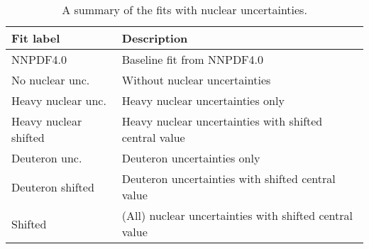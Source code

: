 \begin{table}[h]
  \centering
  \scriptsize
  \renewcommand{\arraystretch}{1.13}
  \begin{tabularx}{0.8\textwidth}{lX}
    \toprule
    {\bf Fit label }     & { \bf Description }\\
    \midrule
    NNPDF4.0    & Baseline fit from NNPDF4.0 \\
    No nuclear unc. & Without nuclear uncertainties \\
    Heavy nuclear unc. & Heavy nuclear uncertainties only \\
    Heavy nuclear shifted & Heavy nuclear uncertainties with shifted central value \\
    Deuteron unc. & Deuteron uncertainties only \\
    Deuteron shifted & Deuteron uncertainties with shifted central value \\
    Shifted & (All) nuclear uncertainties with shifted central value \\  
    \bottomrule
  \end{tabularx}
  \caption{A summary of the fits with nuclear uncertainties.}
  \label{tab:fits-unc}
\end{table}
